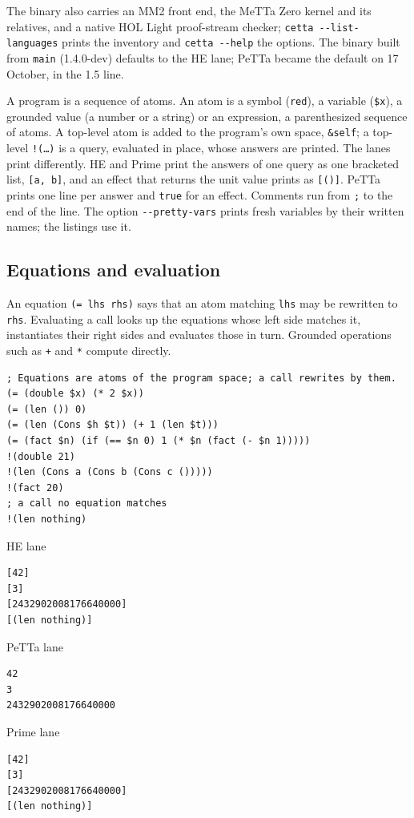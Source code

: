 \documentclass[11pt]{article}
\newcommand{\code}[1]{\texttt{#1}}
\newcommand{\outhead}[1]{{\footnotesize\sffamily #1}\par\vspace{1pt}}
\newcommand{\PeTTa}{\textup{PeTTa}}
\newcommand{\HE}{\textup{HE}}
\begin{document}
\noindent
The binary also carries an MM2 front end, the MeTTa Zero kernel and its
relatives, and a native HOL Light proof-stream checker; \code{cetta
-{}-list-languages} prints the inventory and \code{cetta -{}-help} the options.
The binary built from \code{main} (1.4.0-dev) defaults to the \HE{} lane;
\PeTTa{} became the default on 17 October, in the 1.5 line.

A program is a sequence of atoms.  An atom is a symbol (\code{red}), a
variable (\code{\$x}), a grounded value (a number or a string) or an
expression, a parenthesized sequence of atoms.  A top-level atom is added to
the program's own space, \code{\&self}; a top-level \code{!(\ldots)} is a
query, evaluated in place, whose answers are printed.  The lanes print
differently.  \HE{} and Prime print the answers of one query as one bracketed
list, \code{[a, b]}, and an effect that returns the unit value prints as
\code{[()]}.  \PeTTa{} prints one line per answer and \code{true} for an
effect.  Comments run from \code{;} to the end of the line.  The option
\code{-{}-pretty-vars} prints fresh variables by their written names; the
listings use it.

\subsection{Equations and evaluation}
\label{sec:tut-equations}

An equation \code{(= lhs rhs)} says that an atom matching \code{lhs} may be
rewritten to \code{rhs}.  Evaluating a call looks up the equations whose
left side matches it, instantiates their right sides and evaluates those in
turn.  Grounded operations such as \code{+} and \code{*} compute directly.

\begin{lstlisting}[style=metta,caption={Equations and evaluation; all three lanes},label={lst:t01}]
; Equations are atoms of the program space; a call rewrites by them.
(= (double $x) (* 2 $x))
(= (len ()) 0)
(= (len (Cons $h $t)) (+ 1 (len $t)))
(= (fact $n) (if (== $n 0) 1 (* $n (fact (- $n 1)))))
!(double 21)
!(len (Cons a (Cons b (Cons c ()))))
!(fact 20)
; a call no equation matches
!(len nothing)
\end{lstlisting}
\noindent\begin{minipage}[t]{0.32\textwidth}
\outhead{HE lane}
\begin{lstlisting}[style=out]
[42]
[3]
[2432902008176640000]
[(len nothing)]
\end{lstlisting}
\end{minipage}\hfill
\begin{minipage}[t]{0.32\textwidth}
\outhead{PeTTa lane}
\begin{lstlisting}[style=out]
42
3
2432902008176640000
\end{lstlisting}
\end{minipage}\hfill
\begin{minipage}[t]{0.32\textwidth}
\outhead{Prime lane}
\begin{lstlisting}[style=out]
[42]
[3]
[2432902008176640000]
[(len nothing)]
\end{lstlisting}
\end{minipage}
\end{document}
